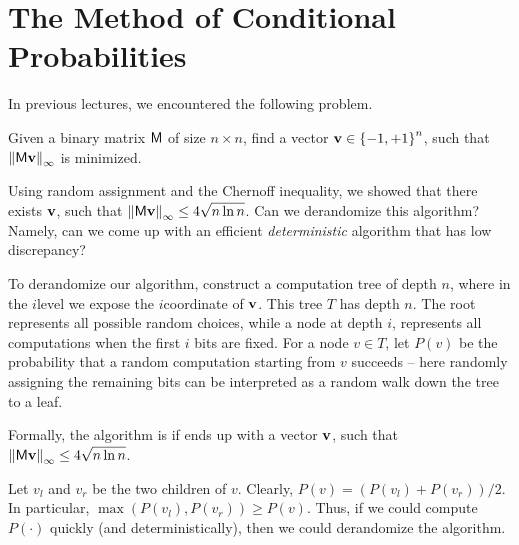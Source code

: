 \section{The Method of Conditional Probabilities}

In previous lectures, we encountered the following problem.

\begin{problem}
    Given a binary matrix $\mathsf{M}$ of size $n \times n$, find a
    vector $\mathbf{v} \in \left\{ {-1,+1} \right\}^n$, such that
    $\left\| {\mathsf{M} \mathbf{v}} \right\|_\infty$ is minimized.
\end{problem}

Using random assignment and the Chernoff inequality, we showed that
there exists $\mathbf{v}$, such that
$\left\| {\mathsf{M} \mathbf{v}} \right\|_\infty \leq 4 \sqrt{ n\ln n}$. Can we
derandomize this algorithm?  Namely, can we come up with an efficient
\emph{deterministic} algorithm that has low discrepancy?

To derandomize our algorithm, construct a computation tree of depth
$n$, where in the $i$\th level we expose the $i$\th coordinate of
$\mathbf{v}$.  This tree $T$ has depth $n$. The root represents all
possible random choices, while a node at depth $i$, represents all
computations when the first $i$ bits are fixed. For a node $v \in T$,
let $P(v)$ be the probability that a random computation starting from
$v$ succeeds -- here randomly assigning the remaining bits can be
interpreted as a random walk down the tree to a leaf.

Formally, the algorithm is  if ends up with a vector
$\mathbf{v}$, such that
$\left\| {\mathsf{M} \mathbf{v}} \right\|_\infty \leq 4 \sqrt{ n\ln n}$.

Let $v_l$ and $v_r$ be the two children of $v$.
Clearly, $P(v) = (P(v_l) + P(v_r))/2$. In particular, $\max( P(v_l),
P(v_r)) \geq P(v)$. Thus, if we could compute $P(\cdot)$ quickly (and
deterministically), then we could derandomize the algorithm.


